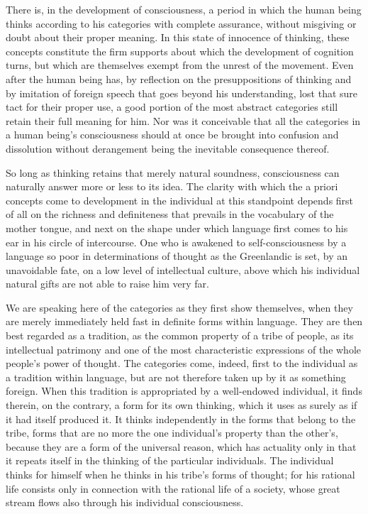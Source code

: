 \documentclass[12pt]{article}
\newcommand{\opage}[1]{\marginnote{\footnotesize\textit{[#1]}}}
\begin{document}
There is, in the development of consciousness, a period in which the human being
thinks according to his categories with complete assurance, without misgiving or
doubt about their proper meaning. In this state of innocence of thinking, these
concepts constitute the firm supports about which the development of cognition
turns, but which are themselves exempt from the unrest of the movement. Even after
the human being has, by \opage{197}reflection on the presuppositions of thinking
and by imitation of foreign speech that goes beyond his understanding, lost that
sure tact for their proper use, a good portion of the most abstract categories
still retain their full meaning for him. Nor was it conceivable that all the
categories in a human being's consciousness should at once be brought into
confusion and dissolution without derangement being the inevitable consequence
thereof.

So long as thinking retains that merely natural soundness, consciousness can
naturally answer more or less to its idea. The clarity with which the a priori
concepts come to development in the individual at this standpoint depends first of
all on the richness and definiteness that prevails in the vocabulary of the mother
tongue, and next on the shape under which language first comes to his ear in his
circle of intercourse. One who is awakened to self-consciousness by a language so
poor in determinations of thought as the Greenlandic is set, by an unavoidable
fate, on a low level of intellectual culture, above which his individual natural
gifts are not able to raise him very far.

We are speaking here of the categories as they first show themselves, when they
are merely immediately held fast in definite forms within language. They are then
best regarded as a tradition, as the common property of a tribe of people, as its
intellectual patrimony and one of the most characteristic expressions of the whole
people's power of thought. The categories come, indeed, first to the individual as
a tradition within language, but are not therefore taken up by it as something
foreign. When this tradition is appropriated by a well-endowed individual, it
finds therein, on the contrary, a form for its own thinking, which it uses as
surely as if it had itself produced it. It thinks independently in the forms that
belong to the tribe, forms that are no more the one individual's property than the
other's, because they are a form of the universal reason, which has actuality only
in that it repeats itself in the thinking of the particular individuals.
\opage{198}The individual thinks for himself when he thinks in his tribe's forms
of thought; for his rational life consists only in connection with the rational
life of a society, whose great stream flows also through his individual
consciousness.
\end{document}
